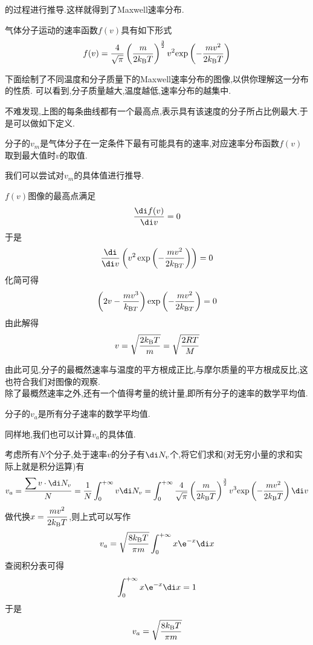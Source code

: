 \documentclass{ctexart}
\begin{document}
的过程进行推导.这样就得到了Maxwell速率分布.
\begin{theorem}[1B.2.2 Maxwell速率分布]
    气体分子运动的速率函数$f(v)$具有如下形式
    \[f(v)=\dfrac{4}{\sqrt\pi}\left(\dfrac{m}{2k_\text BT}\right)^{\frac32}v^2\text{exp}\left(-\dfrac{mv^2}{2k_\text BT}\right)\]

\end{theorem}
下面绘制了不同温度和分子质量下的Maxwell速率分布的图像,以供你理解这一分布的性质.%
可以看到,分子质量越大,温度越低,速率分布的越集中.
\begin{figure}[H]
    \centering
\end{figure}
\indent 不难发现,上图的每条曲线都有一个最高点,表示具有该速度的分子所占比例最大.于是可以做如下定义.
\begin{definition}[1B.2.3 最概然速率]
    分子的$v_m$是气体分子在一定条件下最有可能具有的速率,对应速率分布函数$f(v)$取到最大值时$v$的取值.
\end{definition}
我们可以尝试对$v_m$的具体值进行推导.
\begin{derivation}
    $f(v)$图像的最高点满足
    \[\dfrac{\di f(v)}{\di v}=0\]
    于是
    \[\dfrac{\di}{\di v}\left(v^2\exp\left(-\dfrac{mv^2}{2k_{\text BT}}\right)\right)=0\]
    化简可得
    \[\left(2v-\dfrac{mv^3}{k_{\text BT}}\right)\exp\left(-\dfrac{mv^2}{2k_{\text BT}}\right)=0\]
    由此解得
    \[v=\sqrt{\dfrac{2k_\text BT}{m}}=\sqrt{\dfrac{2RT}{M}}\]

\end{derivation}
由此可见,分子的最概然速率与温度的平方根成正比,与摩尔质量的平方根成反比,这也符合我们对图像的观察.\\
\indent 除了最概然速率之外,还有一个值得考量的统计量,即所有分子的速率的数学平均值.
\begin{definition}[1B.2.4 数学平均速率]
    分子的$v_a$是所有分子速率的数学平均值.
\end{definition}
同样地,我们也可以计算$v_a$的具体值.
\begin{derivation}
    考虑所有$N$个分子,处于速率$v$的分子有$\di N_v$个,将它们求和(对无穷小量的求和实际上就是积分运算)有
    \[v_a=\dfrac{\displaystyle\sum v\cdot\di N_v}{N}=\dfrac1N\int_{0}^{+\infty}v\di N_v
    =\int_0^{+\infty}\dfrac{4}{\sqrt\pi}\left(\dfrac{m}{2k_\text BT}\right)^{\frac32}v^3\text{exp}\left(-\dfrac{mv^2}{2k_\text BT}\right)\di v\]
    做代换$x=\dfrac{mv^2}{2k_\text BT}$,则上式可以写作
    \[v_a=\sqrt{\dfrac{8k_\text BT}{\pi m}}\int_{0}^{+\infty}x\e^{-x}\di x\]
    查阅积分表可得
    \[\int_{0}^{+\infty}x\e^{-x}\di x=1\]
    于是
    \[v_a=\sqrt{\dfrac{8k_\text BT}{\pi m}}\]

\end{derivation}
\end{document}
